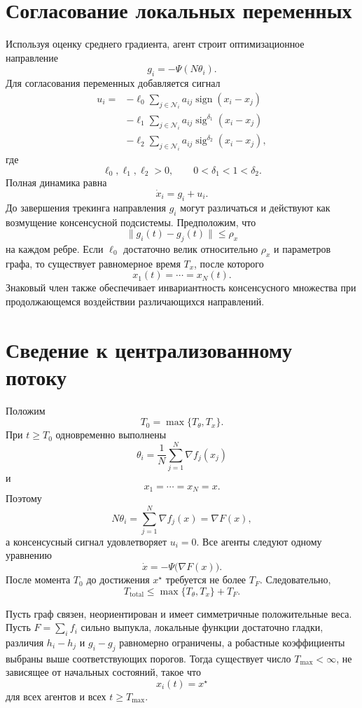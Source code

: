 \section{Согласование локальных переменных}

Используя оценку среднего градиента, агент строит оптимизационное
направление
\[
    g_i=-\Psi(N\theta_i).
\]
Для согласования переменных добавляется сигнал
\[
\begin{aligned}
    u_i
    ={}&
    -\ell_0\sum_{j\in\mathcal N_i}
    a_{ij}\operatorname{sign}(x_i-x_j)
    \\
    &-
    \ell_1\sum_{j\in\mathcal N_i}
    a_{ij}\operatorname{sig}^{\delta_1}(x_i-x_j)
    \\
    &-
    \ell_2\sum_{j\in\mathcal N_i}
    a_{ij}\operatorname{sig}^{\delta_2}(x_i-x_j),
\end{aligned}
\]
где
\[
    \ell_0,\ell_1,\ell_2>0,
    \qquad
    0<\delta_1<1<\delta_2.
\]
Полная динамика равна
\[
    \dot x_i=g_i+u_i.
\]
До завершения трекинга направления \(g_i\) могут различаться и
действуют как возмущение консенсусной подсистемы. Предположим, что
\[
    \lVert g_i(t)-g_j(t)\rVert\le\rho_x
\]
на каждом ребре. Если \(\ell_0\) достаточно велик относительно
\(\rho_x\) и параметров графа, то существует равномерное время
\(T_x\), после которого
\[
    x_1(t)=\cdots=x_N(t).
\]
Знаковый член также обеспечивает инвариантность консенсусного
множества при продолжающемся воздействии различающихся направлений.

\section{Сведение к централизованному потоку}

Положим
\[
    T_0=\max\{T_\theta,T_x\}.
\]
При \(t\ge T_0\) одновременно выполнены
\[
    \theta_i
    =
    \frac1N\sum_{j=1}^{N}\nabla f_j(x_j)
\]
и
\[
    x_1=\cdots=x_N=x.
\]
Поэтому
\[
    N\theta_i
    =
    \sum_{j=1}^{N}\nabla f_j(x)
    =
    \nabla F(x),
\]
а консенсусный сигнал удовлетворяет \(u_i=0\). Все агенты следуют
одному уравнению
\[
    \dot x=-\Psi\bigl(\nabla F(x)\bigr).
\]
После момента \(T_0\) до достижения \(x^\star\) требуется не более
\(T_F\). Следовательно,
\[
    T_{\mathrm{total}}
    \le
    \max\{T_\theta,T_x\}+T_F.
\]

\begin{theorem}
Пусть граф связен, неориентирован и имеет симметричные положительные
веса. Пусть \(F=\sum_i f_i\) сильно выпукла, локальные функции
достаточно гладки, различия \(h_i-h_j\) и \(g_i-g_j\) равномерно
ограничены, а робастные коэффициенты выбраны выше соответствующих
порогов. Тогда существует число \(T_{\max}<\infty\), не зависящее от
начальных состояний, такое что
\[
    x_i(t)=x^\star
\]
для всех агентов и всех \(t\ge T_{\max}\).
\end{theorem}


